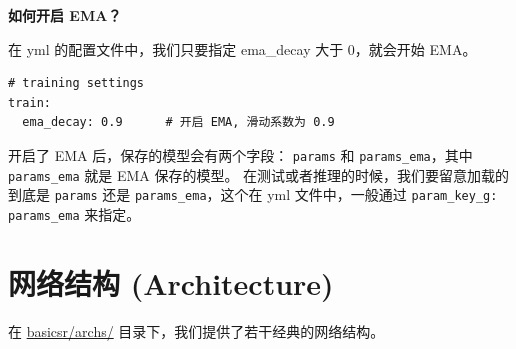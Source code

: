\documentclass[../main.tex]{subfiles}
\begin{document}
\begin{hl} %
    \textbf{如何开启 EMA？}

    在 yml 的配置文件中，我们只要指定 ema\_decay 大于 0，就会开始 EMA。
    \begin{verbatim}
# training settings
train:
  ema_decay: 0.9      # 开启 EMA, 滑动系数为 0.9
\end{verbatim}
\end{hl}

开启了 EMA 后，保存的模型会有两个字段： \texttt{params} 和 \texttt{params\_ema}，其中  \texttt{params\_ema} 就是 EMA 保存的模型。
在测试或者推理的时候，我们要留意加载的到底是 \texttt{params} 还是 \texttt{params\_ema}，这个在 yml 文件中，一般通过  \texttt{param\_key\_g: params\_ema} 来指定。

\section{网络结构 (Architecture)} \label{code_structure:arch}
在 \href{https://github.com/XPixelGroup/BasicSR/tree/master/basicsr/archs}{basicsr/archs/} 目录下，我们提供了若干经典的网络结构。
\end{document}
